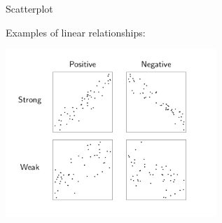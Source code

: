 \documentclass{beamer}\usepackage[]{graphicx}\usepackage[]{color}
\begin{document}
\begin{frame}{Scatterplot}

Examples of linear relationships:
\begin{center}
\includegraphics[height=2.5in]{P1.png}
\end{center}
\end{frame}
\end{document}
